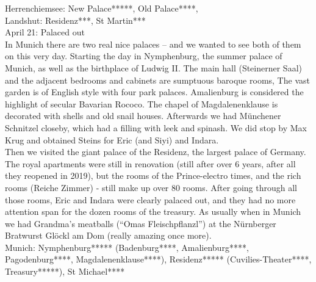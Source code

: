 Herrenchiemsee: New Palace*****, Old Palace****, \\
Landshut: Residenz***, St Martin***\\

April 21: Palaced out\\
In Munich there are two real nice palaces -- and we wanted to see both of them on this very day. Starting the day in Nymphenburg, the summer palace of Munich, as well as the birthplace of Ludwig II. The main hall (Steinerner Saal) and the adjacent bedrooms and cabinets are sumptuous baroque rooms, The vast garden is of English style with four park palaces. Amalienburg is considered the highlight of secular Bavarian Rococo. The chapel of Magdalenenklause is decorated with shells and old snail houses. Afterwards we had M\"unchener Schnitzel closeby, which had a filling with leek and spinash. We did stop by Max Krug and obtained Steins for Eric (and Siyi) and Indara.\\
Then we visited the giant palace of the Residenz, the largest palace of Germany. The royal apartments were still in renovation (still after over 6 years, after all they reopened in 2019), but the rooms of the Prince-electro times, and the rich rooms (Reiche Zimmer) - still make up over 80 rooms. After going through all those rooms, Eric and Indara were clearly palaced out, and they had no more attention span for the dozen rooms of the treasury. As usually when in Munich we had Grandma's meatballs (``Omas Fleischpflanzl'') at the N\"urnberger Bratwurst Gl\"ockl am Dom (really amazing once more).\\

Munich: Nymphenburg***** (Badenburg****, Amalienburg****, Pagodenburg****, Magdalenenklause****), Residenz***** (Cuvilies-Theater****, Treasury*****), St Michael****\\


